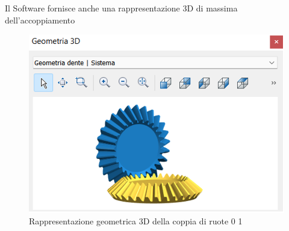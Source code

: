 Il Software fornisce anche una rappresentazione 3D di massima dell’accoppiamento
\begin{figure}[h]
    \centering
    \includegraphics[scale=0.5]{Immagini/GeometriaCoppia01.png}
    \caption{Rappresentazione geometrica 3D della coppia di ruote 0 1}
    \label{fig:GeometriaCoppia01}
\end{figure}

